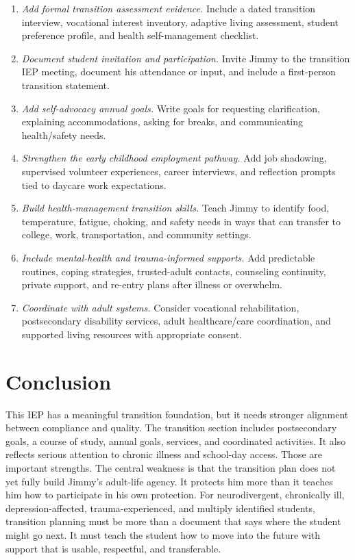 \documentclass[11pt]{article}
\begin{document}
\begin{enumerate}
  \item \textit{Add formal transition assessment evidence.} Include a dated transition interview, vocational interest inventory, adaptive living assessment, student preference profile, and health self-management checklist.
  \item \textit{Document student invitation and participation.} Invite Jimmy to the transition IEP meeting, document his attendance or input, and include a first-person transition statement.
  \item \textit{Add self-advocacy annual goals.} Write goals for requesting clarification, explaining accommodations, asking for breaks, and communicating health/safety needs.
  \item \textit{Strengthen the early childhood employment pathway.} Add job shadowing, supervised volunteer experiences, career interviews, and reflection prompts tied to daycare work expectations.
  \item \textit{Build health-management transition skills.} Teach Jimmy to identify food, temperature, fatigue, choking, and safety needs in ways that can transfer to college, work, transportation, and community settings.
  \item \textit{Include mental-health and trauma-informed supports.} Add predictable routines, coping strategies, trusted-adult contacts, counseling continuity, private support, and re-entry plans after illness or overwhelm.
  \item \textit{Coordinate with adult systems.} Consider vocational rehabilitation, postsecondary disability services, adult healthcare/care coordination, and supported living resources with appropriate consent.
\end{enumerate}

\section{Conclusion}

This IEP has a meaningful transition foundation, but it needs stronger alignment between compliance and quality. The transition section includes postsecondary goals, a course of study, annual goals, services, and coordinated activities. It also reflects serious attention to chronic illness and school-day access. Those are important strengths. The central weakness is that the transition plan does not yet fully build Jimmy's adult-life agency. It protects him more than it teaches him how to participate in his own protection. For neurodivergent, chronically ill, depression-affected, trauma-experienced, and multiply identified students, transition planning must be more than a document that says where the student might go next. It must teach the student how to move into the future with support that is usable, respectful, and transferable.
\end{document}
